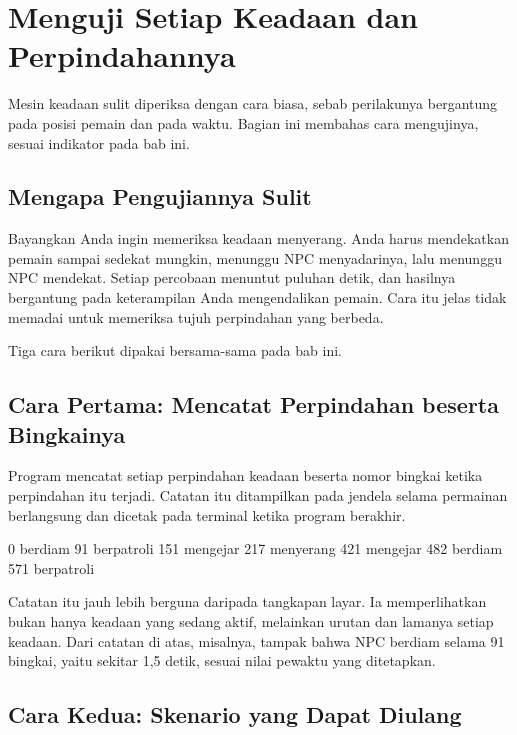 \section{Menguji Setiap Keadaan dan Perpindahannya}
\label{sec:menguji-keadaan}

Mesin keadaan sulit diperiksa dengan cara biasa, sebab perilakunya bergantung
pada posisi pemain dan pada waktu. Bagian ini membahas cara mengujinya, sesuai
indikator  pada bab ini.

\subsection{Mengapa Pengujiannya Sulit}

Bayangkan Anda ingin memeriksa keadaan menyerang. Anda harus mendekatkan pemain
sampai sedekat mungkin, menunggu NPC menyadarinya, lalu menunggu NPC mendekat.
Setiap percobaan menuntut puluhan detik, dan hasilnya bergantung pada
keterampilan Anda mengendalikan pemain. Cara itu jelas tidak memadai untuk
memeriksa tujuh perpindahan yang berbeda.

Tiga cara berikut dipakai bersama-sama pada bab ini.

\subsection{Cara Pertama: Mencatat Perpindahan beserta Bingkainya}

Program mencatat setiap perpindahan keadaan beserta nomor bingkai ketika
perpindahan itu terjadi. Catatan itu ditampilkan pada jendela selama permainan
berlangsung dan dicetak pada terminal ketika program berakhir.

\begin{kodekeluaran}
    0  berdiam
   91  berpatroli
  151  mengejar
  217  menyerang
  421  mengejar
  482  berdiam
  571  berpatroli
\end{kodekeluaran}

Catatan itu jauh lebih berguna daripada tangkapan layar. Ia memperlihatkan
bukan hanya keadaan yang sedang aktif, melainkan urutan dan lamanya setiap
keadaan. Dari catatan di atas, misalnya, tampak bahwa NPC berdiam selama 91
bingkai, yaitu sekitar 1,5 detik, sesuai nilai pewaktu yang ditetapkan.

\subsection{Cara Kedua: Skenario yang Dapat Diulang}

